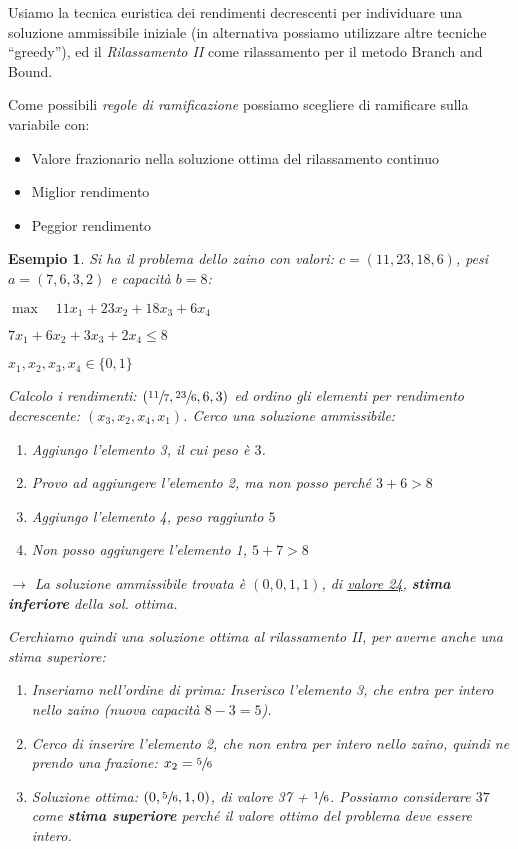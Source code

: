 \documentclass[a4paper,11pt]{book}
\theoremstyle{break}
\newtheorem{es}[deff]{Esempio}
\begin{document}
Usiamo la tecnica euristica dei rendimenti decrescenti per individuare una soluzione ammissibile iniziale (in alternativa possiamo utilizzare altre tecniche ``greedy''), ed il \emph{Rilassamento II} come rilassamento per il metodo Branch and Bound. \smallskip

Come possibili \emph{regole di ramificazione} possiamo scegliere di ramificare sulla variabile con:
\begin{itemize}
 \item Valore frazionario nella soluzione ottima del rilassamento continuo
 \item Miglior rendimento
 \item Peggior rendimento
\end{itemize}

\begin{es}
Si ha il problema dello zaino con valori: $c = (11, 23, 18, 6)$, pesi $a = (7, 6, 3, 2)$ e capacità $b = 8$:

\begin{center}
 $\max \quad11x_1 + 23 x_2 + 18 x_3 + 6x_4$\smallskip
 
 $7x_1 + 6x_2 + 3x_3 + 2x_4 \leq 8$\smallskip
 
 $x_1, x_2, x_3, x_4 \in \{0, 1\}$
\end{center}

Calcolo i rendimenti: $(\sfrac{11}{7}, \sfrac{23}{6}, 6, 3)$ ed ordino gli elementi per rendimento decrescente: $(x_3, x_2, x_4, x_1)$. Cerco una soluzione ammissibile: \smallskip
\begin{enumerate}[-]
 \item Aggiungo l'elemento 3, il cui peso è $3$. 
 \item Provo ad aggiungere l'elemento 2, ma non posso perché $3+6>8$
 \item Aggiungo l'elemento 4, peso raggiunto $5$
 \item Non posso aggiungere l'elemento 1, $5+7 > 8$
\end{enumerate}
$\to$ La soluzione ammissibile trovata è $(0,0,1,1)$, di \underline{valore 24}, \textbf{stima inferiore} della sol. ottima.\smallskip


Cerchiamo quindi una soluzione ottima al rilassamento II, per averne anche una stima superiore:\smallskip

\begin{enumerate}[-]
 \item Inseriamo nell'ordine di prima: Inserisco l'elemento 3, che entra per intero nello zaino (nuova capacità $8-3 = 5$).
 \item Cerco di inserire l'elemento 2, che non entra per intero nello zaino, quindi ne prendo una frazione: $x_2 = \sfrac{5}{6}$
 \item Soluzione ottima: $(0, \sfrac{5}{6}, 1, 0)$, di valore 37 + $\sfrac{1}{6}$. Possiamo considerare \underline{$37$} come \textbf{stima superiore} perché il valore ottimo del problema deve essere intero.
\end{enumerate}


\end{es}
\end{document}
